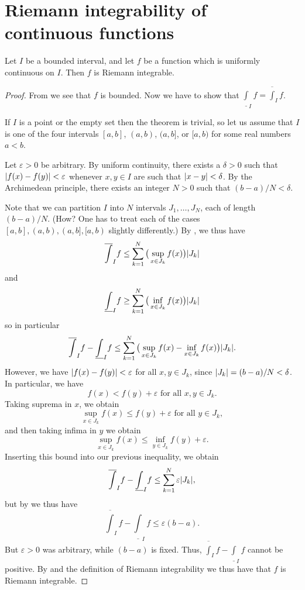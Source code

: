 \section{Riemann integrability of continuous functions}\label{i:sec:11.5}

\begin{thm}\label{i:11.5.1}
  Let \(I\) be a bounded interval, and let \(f\) be a function which is uniformly continuous on \(I\).
  Then \(f\) is Riemann integrable.
\end{thm}

\begin{proof}
  From  we see that \(f\) is bounded.
  Now we have to show that \(\underline{\int}_I f = \overline{\int}_I f\).

  If \(I\) is a point or the empty set then the theorem is trivial, so let us assume that \(I\) is one of the four intervals \([a, b]\), \((a, b)\), \((a, b]\), or \([a, b)\) for some real numbers \(a < b\).

      Let \(\varepsilon > 0\) be arbitrary.
      By uniform continuity, there exists a \(\delta > 0\) such that \(\left\lvert f(x) - f(y)\right\rvert < \varepsilon\) whenever \(x, y \in I\) are such that \(\left\lvert x - y\right\rvert < \delta\).
      By the Archimedean principle, there exists an integer \(N > 0\) such that \((b - a) / N < \delta\).

      Note that we can partition \(I\) into \(N\) intervals \(J_1, \dots, J_N\), each of length \((b - a) / N\).
      (How? One has to treat each of the cases \([a, b], (a, b), (a, b], [a, b)\) slightly differently.)
  By , we thus have
  \[
    \overline{\int}_I f \leq \sum_{k = 1}^N \big(\sup_{x \in J_k} f(x)\big) \abs{J_k}
  \]
  and
  \[
    \underline{\int}_I f \geq \sum_{k = 1}^N \big(\inf_{x \in J_k} f(x)\big) \abs{J_k}
  \]
  so in particular
  \[
    \overline{\int}_I f - \underline{\int}_I f \leq \sum_{k = 1}^N \big(\sup_{x \in J_k} f(x) - \inf_{x \in J_k} f(x)\big) \abs{J_k}.
  \]
  However, we have \(\left\lvert f(x) - f(y)\right\rvert < \varepsilon\) for all \(x, y \in J_k\), since \(\left\lvert J_k\right\rvert = (b - a) / N < \delta\).
  In particular, we have
  \[
    f(x) < f(y) + \varepsilon \text{ for all } x, y \in J_k.
  \]
  Taking suprema in \(x\), we obtain
  \[
    \sup_{x \in J_k} f(x) \leq f(y) + \varepsilon \text{ for all } y \in J_k,
  \]
  and then taking infima in \(y\) we obtain
  \[
    \sup_{x \in J_k} f(x) \leq \inf_{y \in J_k} f(y) + \varepsilon.
  \]
  Inserting this bound into our previous inequality, we obtain
  \[
    \overline{\int}_I f - \underline{\int}_I f \leq \sum_{k = 1}^N \varepsilon \abs{J_k},
  \]
  but by  we thus have
  \[
    \overline{\int}_I f - \underline{\int}_I f \leq \varepsilon (b - a).
  \]
  But \(\varepsilon > 0\) was arbitrary, while \((b - a)\) is fixed.
  Thus, \(\overline{\int}_I f - \underline{\int}_I f\) cannot be positive.
  By  and the definition of Riemann integrability we thus have that \(f\) is Riemann integrable.
\end{proof}

